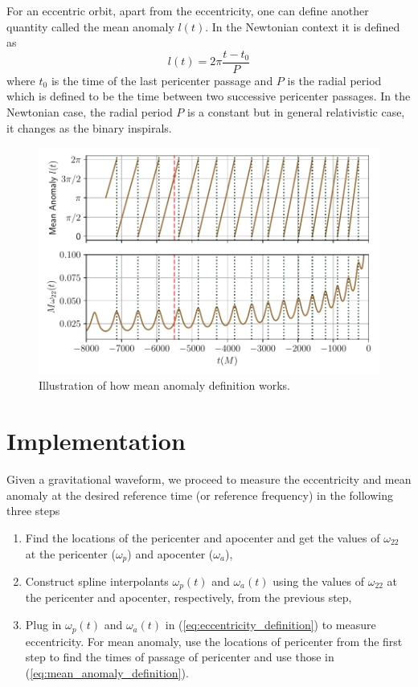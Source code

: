 \documentclass[aps,prd,amsmath,floats,floatfix, twocolumn,
superscriptaddress,nofootinbib,showpacs]{revtex4-1}
\begin{document}
For an eccentric orbit, apart from the eccentricity, one can define another quantity called the mean anomaly $l(t)$. In the Newtonian context it is defined as
\begin{equation}
\label{eq:mean_anomaly_definition}
l(t) = 2\pi \frac{t - t_0}{P}
\end{equation}
where $t_0$ is the time of the last pericenter passage and $P$ is the radial period which is defined to be the time between two successive pericenter passages.
In the Newtonian case, the radial period $P$ is a constant but in general relativistic case, it changes as the binary inspirals.

\begin{figure}[thb]
\includegraphics[width=\columnwidth]{mean_ano_definition}
\caption{Illustration of how mean anomaly definition works.}
\label{fig:mean_anomaly_definition}
\end{figure}


\section{Implementation}
\label{sec:implementation}
Given a gravitational waveform, we proceed to measure the eccentricity and mean anomaly at the desired reference time (or reference frequency) in the following three steps
\begin{enumerate}
\item Find the locations of the pericenter and apocenter and get the values of $\omega_{22}$ at the pericenter ($\omega_p$) and apocenter ($\omega_a$),
\item Construct spline interpolants $\omega_p(t)$ and $\omega_a(t)$ using the values of $\omega_{22}$ at the pericenter and apocenter, respectively, from the previous step,
\item Plug in $\omega_p(t)$ and $\omega_a(t)$ in (\ref{eq:eccentricity_definition}) to measure eccentricity. For mean anomaly, use the locations of pericenter from the first step to find the times of
  passage of pericenter and use those in (\ref{eq:mean_anomaly_definition}).
\end{enumerate}
\end{document}
